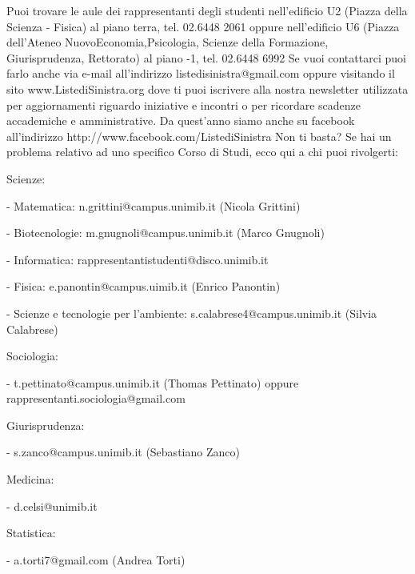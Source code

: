 Puoi trovare le aule dei rappresentanti degli studenti  nell'edificio U2 (Piazza della Scienza - Fisica) al piano terra, tel. 02.6448 2061 oppure nell'edificio U6 (Piazza dell'Ateneo NuovoEconomia,Psicologia, Scienze della Formazione, Giurisprudenza, Rettorato) al piano -1, tel. 02.6448 6992
Se vuoi contattarci puoi farlo anche via e-mail all’indirizzo listedisinistra@gmail.com oppure visitando il sito www.ListediSinistra.org dove ti puoi iscrivere alla nostra newsletter utilizzata per aggiornamenti riguardo iniziative e incontri o per ricordare scadenze accademiche e amministrative.
Da quest'anno siamo anche su facebook all'indirizzo http://www.facebook.com/ListediSinistra 
Non ti basta? Se hai un problema relativo ad uno specifico Corso di Studi, ecco qui a chi puoi rivolgerti:

Scienze:
   \item- Matematica: n.grittini@campus.unimib.it (Nicola Grittini)
   \item- Biotecnologie: m.gnugnoli@campus.unimib.it (Marco Gnugnoli)
   \item- Informatica: rappresentantistudenti@disco.unimib.it
   \item- Fisica: e.panontin@campus.uimib.it (Enrico Panontin)
   \item- Scienze e tecnologie per l'ambiente: s.calabrese4@campus.unimib.it (Silvia Calabrese)
   
Sociologia: 
   \item- t.pettinato@campus.unimib.it (Thomas Pettinato) oppure rappresentanti.sociologia@gmail.com

Giurisprudenza: 
   \item- s.zanco@campus.unimib.it (Sebastiano Zanco)
   
Medicina: 
   \item- d.celsi@unimib.it 
   
Statistica: 
   \item- a.torti7@gmail.com (Andrea Torti)
